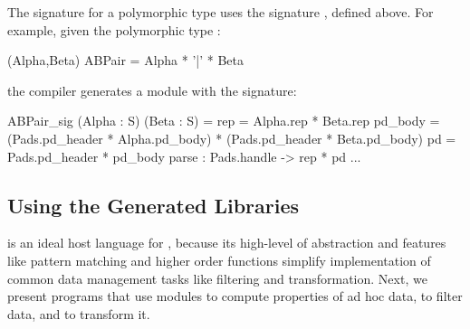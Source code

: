 The signature for a polymorphic \padsml{} type uses the signature
, defined above.  For example, given the polymorphic \padsml{}
type :
\begin{code}\scriptsize
{} (Alpha,Beta) ABPair = Alpha * '|' * Beta\end{code}%
the compiler generates a module with the signature:
\begin{code}\scriptsize
{}  ABPair_sig (Alpha : S) (Beta : S) = 
   rep      = Alpha.rep * Beta.rep
   pd\_body = (Pads.pd_header * Alpha.pd\_body) * 
                 (Pads.pd_header * Beta.pd\_body)
   pd       = Pads.pd_header * pd\_body
    parse    : Pads.handle -> rep * pd
  ...
\end{code}%

\subsection{Using the Generated Libraries}

\ocaml{} is an ideal host language for \padsml{}, because its
high-level of abstraction and features like pattern matching and
higher order functions simplify implementation of common data
management tasks like filtering and transformation.  Next, we
present \ocaml{} programs that use \padsml{} modules to compute
properties of ad hoc data, to filter data, and to transform it.


